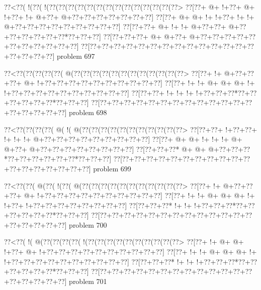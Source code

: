 \vbox{\vbox{\goo
\0??<\0??(\- !(\0??(\- !(\0??(\0??(\0??(\0??(\0??(\0??(\0??(\0??(\0??(\0??(\0??(\0??(\0??(\0??>
\0??[\0??+\- @+\- !+\0??+\- @+\- !+\0??+\- !+\- @+\0??+\- @+\0??+\0??+\0??+\0??+\0??+\0??+\0??]
\0??[\0??+\- @+\- @+\- !+\- !+\0??+\- !+\- !+\- @+\0??+\0??+\0??+\0??+\0??+\0??+\0??+\0??+\0??]
\0??[\0??+\0??+\- @+\- !+\- !+\- @+\0??+\0??+\- @+\0??+\0??+\0??+\0??+\0??+\0??*\0??+\0??+\0??]
\0??[\0??+\0??+\0??+\- @+\- @+\0??+\- @+\0??+\0??+\0??+\0??+\0??+\0??+\0??+\0??+\0??+\0??+\0??]
\0??[\0??+\0??+\0??+\0??+\0??+\0??+\0??+\0??+\0??+\0??+\0??+\0??+\0??+\0??+\0??+\0??+\0??+\0??]
}
\hfil problem 697\hfil\break
}



\vbox{\vbox{\goo
\0??<\0??(\0??(\0??(\0??(\0??(\- @(\0??(\0??(\0??(\0??(\0??(\0??(\0??(\0??(\0??(\0??(\0??(\0??>
\0??[\0??+\- !+\- @+\0??+\0??+\0??+\- @+\- !+\0??+\0??+\0??+\0??+\0??+\0??+\0??+\0??+\0??+\0??]
\0??[\0??+\- !+\- !+\- @+\- @+\- @+\- !+\- !+\0??+\0??+\0??+\0??+\0??+\0??+\0??+\0??+\0??+\0??]
\0??[\0??+\0??+\- !+\- !+\- !+\- !+\0??+\0??+\0??*\0??+\0??+\0??+\0??+\0??+\0??*\0??+\0??+\0??]
\0??[\0??+\0??+\0??+\0??+\0??+\0??+\0??+\0??+\0??+\0??+\0??+\0??+\0??+\0??+\0??+\0??+\0??+\0??]
}
\hfil problem 698\hfil\break
}



\vbox{\vbox{\goo
\0??<\0??(\0??(\0??(\0??(\- @(\- !(\- @(\0??(\0??(\0??(\0??(\0??(\0??(\0??(\0??(\0??(\0??(\0??>
\0??[\0??+\0??+\- !+\0??+\0??+\- !+\- !+\- !+\- @+\0??+\0??+\0??+\0??+\0??+\0??+\0??+\0??+\0??]
\0??[\0??+\- @+\- @+\- !+\- !+\- !+\- @+\- @+\0??+\- @+\0??+\0??+\0??+\0??+\0??+\0??+\0??+\0??]
\0??[\0??+\0??+\0??*\- @+\- @+\- @+\0??+\0??+\0??*\0??+\0??+\0??+\0??+\0??+\0??*\0??+\0??+\0??]
\0??[\0??+\0??+\0??+\0??+\0??+\0??+\0??+\0??+\0??+\0??+\0??+\0??+\0??+\0??+\0??+\0??+\0??+\0??]
}
\hfil problem 699\hfil\break
}



\vbox{\vbox{\goo
\0??<\0??(\0??(\- @(\0??(\- !(\0??(\- @(\0??(\0??(\0??(\0??(\0??(\0??(\0??(\0??(\0??(\0??(\0??>
\0??[\0??+\- !+\- @+\0??+\0??+\0??+\- @+\- !+\0??+\0??+\0??+\0??+\0??+\0??+\0??+\0??+\0??+\0??]
\0??[\0??+\- !+\- !+\- @+\- @+\- @+\- !+\- !+\0??+\- !+\0??+\0??+\0??+\0??+\0??+\0??+\0??+\0??]
\0??[\0??+\0??+\0??*\- !+\- !+\- !+\0??+\0??+\0??*\0??+\0??+\0??+\0??+\0??+\0??*\0??+\0??+\0??]
\0??[\0??+\0??+\0??+\0??+\0??+\0??+\0??+\0??+\0??+\0??+\0??+\0??+\0??+\0??+\0??+\0??+\0??+\0??]
}
\hfil problem 700\hfil\break
}



\vbox{\vbox{\goo
\0??<\0??(\- !(\- @(\0??(\0??(\0??(\0??(\- !(\0??(\0??(\0??(\0??(\0??(\0??(\0??(\0??(\0??(\0??>
\0??[\0??+\- !+\- @+\- @+\- !+\0??+\- @+\- !+\0??+\0??+\0??+\0??+\0??+\0??+\0??+\0??+\0??+\0??]
\0??[\0??+\- !+\- !+\- @+\- @+\- @+\- !+\- !+\0??+\0??+\0??+\0??+\0??+\0??+\0??+\0??+\0??+\0??]
\0??[\0??+\0??+\0??*\- !+\- !+\- !+\0??+\0??+\0??*\0??+\0??+\0??+\0??+\0??+\0??*\0??+\0??+\0??]
\0??[\0??+\0??+\0??+\0??+\0??+\0??+\0??+\0??+\0??+\0??+\0??+\0??+\0??+\0??+\0??+\0??+\0??+\0??]
}
\hfil problem 701\hfil\break
}



